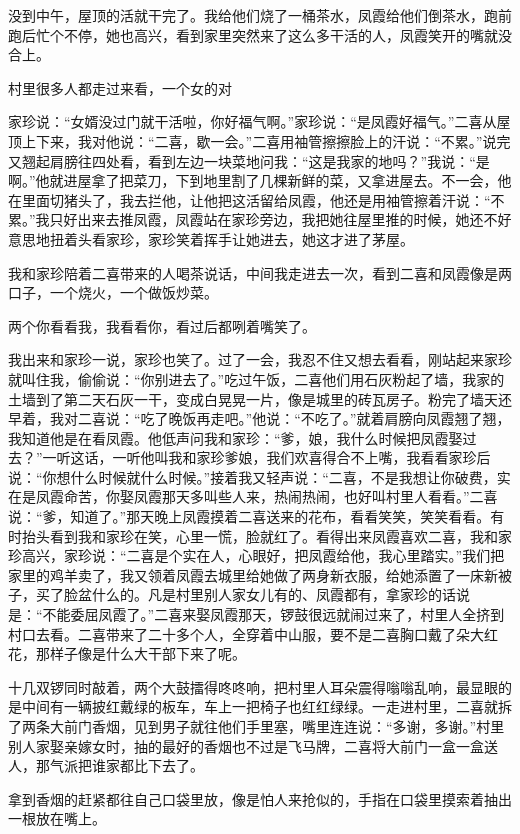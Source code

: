 \documentclass[12pt,UTF8]{ctexbook}
\begin{document}
没到中午，屋顶的活就干完了。我给他们烧了一桶茶水，凤霞给他们倒茶水，跑前跑后忙个不停，她也高兴，看到家里突然来了这么多干活的人，凤霞笑开的嘴就没合上。

村里很多人都走过来看，一个女的对


家珍说：“女婿没过门就干活啦，你好福气啊。”家珍说：“是凤霞好福气。”二喜从屋顶上下来，我对他说：“二喜，歇一会。”二喜用袖管擦擦脸上的汗说：“不累。”说完又翘起肩膀往四处看，看到左边一块菜地问我：“这是我家的地吗？”我说：“是啊。”他就进屋拿了把菜刀，下到地里割了几棵新鲜的菜，又拿进屋去。不一会，他在里面切猪头了，我去拦他，让他把这活留给凤霞，他还是用袖管擦着汗说：“不累。”我只好出来去推凤霞，凤霞站在家珍旁边，我把她往屋里推的时候，她还不好意思地扭着头看家珍，家珍笑着挥手让她进去，她这才进了茅屋。

我和家珍陪着二喜带来的人喝茶说话，中间我走进去一次，看到二喜和凤霞像是两口子，一个烧火，一个做饭炒菜。

两个你看看我，我看看你，看过后都咧着嘴笑了。

我出来和家珍一说，家珍也笑了。过了一会，我忍不住又想去看看，刚站起来家珍就叫住我，偷偷说：“你别进去了。”吃过午饭，二喜他们用石灰粉起了墙，我家的土墙到了第二天石灰一干，变成白晃晃一片，像是城里的砖瓦房子。粉完了墙天还早着，我对二喜说：“吃了晚饭再走吧。”他说：“不吃了。”就着肩膀向凤霞翘了翘，我知道他是在看凤霞。他低声问我和家珍：“爹，娘，我什么时候把凤霞娶过去？”一听这话，一听他叫我和家珍爹娘，我们欢喜得合不上嘴，我看看家珍后说：“你想什么时候就什么时候。”接着我又轻声说：“二喜，不是我想让你破费，实在是凤霞命苦，你娶凤霞那天多叫些人来，热闹热闹，也好叫村里人看看。”二喜说：“爹，知道了。”那天晚上凤霞摸着二喜送来的花布，看看笑笑，笑笑看看。有时抬头看到我和家珍在笑，心里一慌，脸就红了。看得出来凤霞喜欢二喜，我和家珍高兴，家珍说：“二喜是个实在人，心眼好，把凤霞给他，我心里踏实。”我们把家里的鸡羊卖了，我又领着凤霞去城里给她做了两身新衣服，给她添置了一床新被子，买了脸盆什么的。凡是村里别人家女儿有的、凤霞都有，拿家珍的话说是：“不能委屈凤霞了。”二喜来娶凤霞那天，锣鼓很远就闹过来了，村里人全挤到村口去看。二喜带来了二十多个人，全穿着中山服，要不是二喜胸口戴了朵大红花，那样子像是什么大干部下来了呢。

十几双锣同时敲着，两个大鼓擂得咚咚响，把村里人耳朵震得嗡嗡乱响，最显眼的是中间有一辆披红戴绿的板车，车上一把椅子也红红绿绿。一走进村里，二喜就拆了两条大前门香烟，见到男子就往他们手里塞，嘴里连连说：“多谢，多谢。”村里别人家娶亲嫁女时，抽的最好的香烟也不过是飞马牌，二喜将大前门一盒一盒送人，那气派把谁家都比下去了。

拿到香烟的赶紧都往自己口袋里放，像是怕人来抢似的，手指在口袋里摸索着抽出一根放在嘴上。
\end{document}
